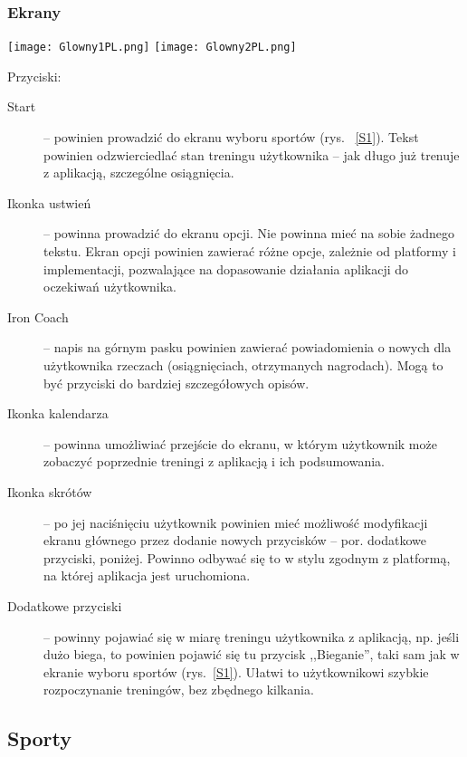 \subsubsection{Ekrany}
\begin{minipage}{0.5\textwidth}
  \label{G1}
  \texttt{[image: Glowny1PL.png]}
  \label{G2}
  \texttt{[image: Glowny2PL.png]}
\end{minipage}
\begin{minipage}{0.5\textwidth}
Przyciski:\\
\begin{description}
  \item[Start] -- powinien prowadzić do ekranu wyboru sportów (rys. ~\ref{S1}). Tekst powinien odzwierciedlać stan treningu użytkownika -- jak długo już trenuje z aplikacją, szczególne osiągnięcia.
  \item[Ikonka ustwień] -- powinna prowadzić do ekranu opcji. Nie powinna mieć na sobie żadnego tekstu. Ekran opcji powinien zawierać różne opcje, zależnie od platformy i implementacji, pozwalające na dopasowanie działania aplikacji do oczekiwań użytkownika.
  \item[Iron Coach] -- napis na górnym pasku powinien zawierać powiadomienia o nowych dla użytkownika rzeczach (osiągnięciach, otrzymanych nagrodach). Mogą to być przyciski do bardziej szczegółowych opisów.
  \item[Ikonka kalendarza] -- powinna umożliwiać przejście do ekranu, w którym użytkownik może zobaczyć poprzednie treningi z aplikacją i ich podsumowania.
  \item[Ikonka skrótów] -- po jej naciśnięciu użytkownik powinien mieć możliwość modyfikacji ekranu głównego przez dodanie nowych przycisków -- por. dodatkowe przyciski, poniżej. Powinno odbywać się to w stylu zgodnym z platformą, na której aplikacja jest uruchomiona.
  \item[Dodatkowe przyciski] -- powinny pojawiać się w miarę treningu użytkownika z aplikacją, np. jeśli dużo biega, to powinien pojawić się tu przycisk ,,Bieganie'', taki sam jak w ekranie wyboru sportów (rys.~\ref{S1}). Ułatwi to użytkownikowi szybkie rozpoczynanie treningów, bez zbędnego kilkania.
\end{description}
\end{minipage}
\subsection{Sporty}
